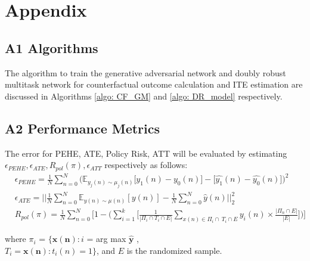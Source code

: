 \documentclass{amia}
\begin{document}





\makeatletter
\renewcommand{\@biblabel}[1]{\hfill #1.}
\makeatother


  

\section*{Appendix}
\subsection*{A1 Algorithms}
The algorithm to train the generative adversarial network and doubly robust multitask network for counterfactual outcome calculation and ITE estimation are discussed in Algorithms \ref{algo: CF_GM} and \ref{algo: DR_model} respectively.
\subsection*{A2 Performance Metrics}
\label{pmetrics}
The error for PEHE, ATE, Policy Risk, ATT will be evaluated by estimating $\epsilon_{PEHE}, \epsilon_{ATE}, R_{pol}(\pi), \epsilon_{ATT}$ respectively as follows:
\begin{align} 
    &\epsilon_{PEHE} = \frac{1}{N}\sum_{n=0}^N\Big(\mathbb{E}_{y_{j}(n)\sim \mu_j(n)}\big[y_1(n) - y_0(n)\big] 
    - \big[\hat{y_1}(n) - \hat{y_0}(n)\big]\Big)^2 \\
    &\epsilon_{ATE} = ||\frac{1}{N}\sum_{n=0}^N\mathbb{E}_{y(n) \sim \mu(n)}[y(n)] 
    -\frac{1}{N} \sum_{n=0}^N\hat y(n) ||_2^2 \\
    &R_{pol}(\pi) = \frac{1}{N}\sum_{n=0}^N\Big[1 - 
    \Big(\sum_{i=1}^{k}\Big[\frac{1}{|{\Pi_i\cap T_i \cap E}|} 
    \sum_{x(n)\in \Pi_i\cap\ T_i\cap E} y_i(n) \times \frac{|\Pi_n \cap E|}{|E|}\Big] \Big)\Big] 
\label{equ: PEHE}
\end{align}

where $\pi_i$ = $\{\boldsymbol{x(n)}: i$ = arg max $\hat{\boldsymbol{y}}$ , 
\\$T_i = {\boldsymbol{x(n)} : t_i(n) = 1\}}$, and $E$ is the randomized sample.
\end{document}
